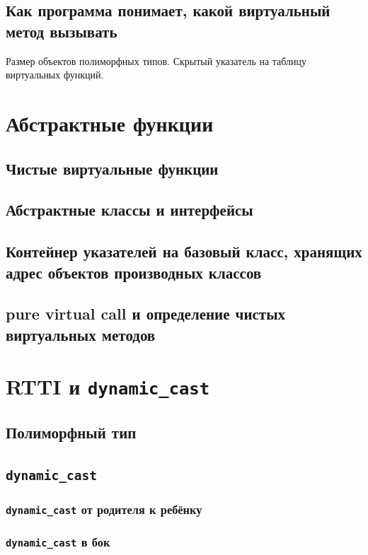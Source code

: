 \documentclass{article}
\begin{document}
\subsection*{Как программа понимает, какой виртуальный метод вызывать}
Размер объектов полиморфных типов. Скрытый указатель на таблицу виртуальных функций.


\section*{Абстрактные функции}
\subsection*{Чистые виртуальные функции}
\subsection*{Абстрактные классы и интерфейсы}
\subsection*{Контейнер указателей на базовый класс, хранящих адрес объектов производных классов}
\subsection*{pure virtual call и определение чистых виртуальных методов}




\section*{RTTI и \texttt{dynamic\_cast}}
\subsection*{Полиморфный тип}
\subsection*{\texttt{dynamic\_cast}}

\subsubsection*{\texttt{dynamic\_cast} от родителя к ребёнку}
\subsubsection*{\texttt{dynamic\_cast} в бок}
\end{document}
